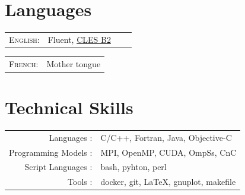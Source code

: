 \documentclass[a4paper,10pt]{article} %
\begin{document}


\section{Languages}

\begin{tabular}{rlrl}
\textsc{English:}   & Fluent, \href{http://www.certification-cles.fr}{CLES B2}\\
\end{tabular}
\hfill
\begin{tabular}{rl}
\textsc{French:}    & Mother tongue\\
\end{tabular}


\section{Technical Skills}

\begin{tabular}{rl}
Languages :                         & C/C++, Fortran, Java, Objective-C       \\
Programming Models :                & MPI, OpenMP, CUDA, OmpSs, CnC           \\
Script Languages :                  & bash, pyhton, perl                      \\
Tools :                             & docker, git, \LaTeX, gnuplot, makefile   \\
\end{tabular}
\end{document}
